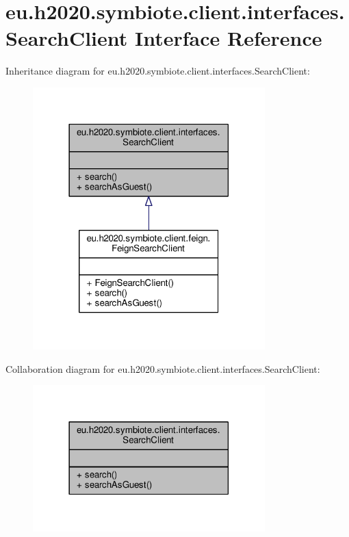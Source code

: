 \hypertarget{interfaceeu_1_1h2020_1_1symbiote_1_1client_1_1interfaces_1_1SearchClient}{}\section{eu.\+h2020.\+symbiote.\+client.\+interfaces.\+Search\+Client Interface Reference}
\label{interfaceeu_1_1h2020_1_1symbiote_1_1client_1_1interfaces_1_1SearchClient}


Inheritance diagram for eu.\+h2020.\+symbiote.\+client.\+interfaces.\+Search\+Client\+:
\nopagebreak
\begin{figure}[H]
\begin{center}
\leavevmode
\includegraphics[width=254pt]{interfaceeu_1_1h2020_1_1symbiote_1_1client_1_1interfaces_1_1SearchClient__inherit__graph}
\end{center}
\end{figure}


Collaboration diagram for eu.\+h2020.\+symbiote.\+client.\+interfaces.\+Search\+Client\+:
\nopagebreak
\begin{figure}[H]
\begin{center}
\leavevmode
\includegraphics[width=254pt]{interfaceeu_1_1h2020_1_1symbiote_1_1client_1_1interfaces_1_1SearchClient__coll__graph}
\end{center}
\end{figure}
